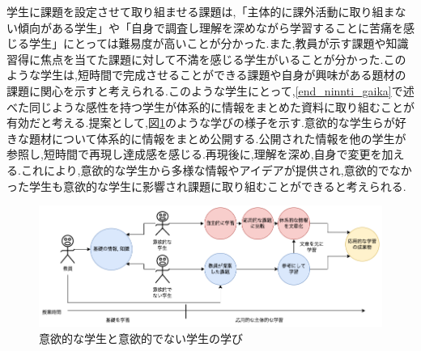 \documentclass[11pt, a4paper]{jreport}
\begin{document}
学生に課題を設定させて取り組ませる課題は,「主体的に課外活動に取り組まない傾向がある学生」や「自身で調査し理解を深めながら学習することに苦痛を感じる学生」にとっては難易度が高いことが分かった.また,教員が示す課題や知識習得に焦点を当てた課題に対して不満を感じる学生がいることが分かった.このような学生は,短時間で完成させることができる課題や自身が興味がある題材の課題に関心を示すと考えられる.このような学生にとって,\ref{end_ninnti_gaika}で述べた同じような感性を持つ学生が体系的に情報をまとめた資料に取り組むことが有効だと考える.提案として,図\ref{fig:tennbou1}のような学びの様子を示す.意欲的な学生らが好きな題材について体系的に情報をまとめ公開する.公開された情報を他の学生が参照し,短時間で再現し達成感を感じる.再現後に,理解を深め,自身で変更を加える.これにより,意欲的な学生から多様な情報やアイデアが提供され,意欲的でなかった学生も意欲的な学生に影響され課題に取り組むことができると考えられる.

\begin{figure}[H]
\begin{center}
\includegraphics[width=140mm]{./img/tennbou1.png}
\caption{意欲的な学生と意欲的でない学生の学び}
\label{fig:tennbou1}
\end{center}
\end{figure}
\end{document}
